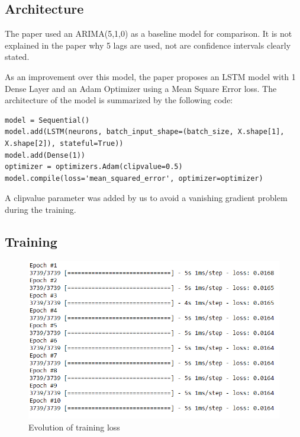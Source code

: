 \documentclass{article}
\begin{document}
\FloatBarrier

\subsection{Architecture}

The paper used an ARIMA(5,1,0) as a baseline model for comparison. It is not explained in the paper why 5 lags are used, not are confidence intervals clearly stated. 

As an improvement over this model, the paper proposes an LSTM model with 1 Dense Layer and an Adam Optimizer using a Mean Square Error loss. The architecture of the model is summarized by the following code:

\begin{verbatim}
model = Sequential()
model.add(LSTM(neurons, batch_input_shape=(batch_size, X.shape[1], X.shape[2]), stateful=True))
model.add(Dense(1))
optimizer = optimizers.Adam(clipvalue=0.5)
model.compile(loss='mean_squared_error', optimizer=optimizer)
\end{verbatim}

A clipvalue parameter was added by us to avoid a vanishing gradient problem during the training.

\subsection{Training}


\begin{figure}[h]
\centering
\includegraphics{Training Progress.PNG}
\caption{Evolution of training loss}
\end{figure}
\end{document}
